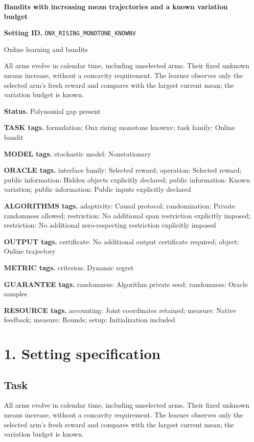 \documentclass[10pt,a4paper]{article}
\begin{document}
\raggedright

{\LARGE\bfseries\sffamily\color{AtlasNavy} Bandits with increasing mean trajectories and a known variation budget\par}\vspace{5pt}
\textbf{Setting ID.} \texttt{ONX\_\allowbreak{}RISING\_\allowbreak{}MONOTONE\_\allowbreak{}KNOWNV}

Online learning and bandits

All arms evolve in calendar time, including unselected arms. Their fixed unknown means increase, without a concavity requirement. The learner observes only the selected arm's fresh reward and compares with the largest current mean; the variation budget is known.

\textbf{Status.} Polynomial gap present

\textbf{TASK tags.} formulation: Onx rising monotone knownv; task family: Online bandit

\textbf{MODEL tags.} stochastic model: Nonstationary

\textbf{ORACLE tags.} interface family: Selected reward; operation: Selected reward; public information: Hidden objects explicitly declared; public information: Known variation; public information: Public inputs explicitly declared

\textbf{ALGORITHMS tags.} adaptivity: Causal protocol; randomization: Private randomness allowed; restriction: No additional span restriction explicitly imposed; restriction: No additional zero-respecting restriction explicitly imposed

\textbf{OUTPUT tags.} certificate: No additional output certificate required; object: Online trajectory

\textbf{METRIC tags.} criterion: Dynamic regret

\textbf{GUARANTEE tags.} randomness: Algorithm private seed; randomness: Oracle samples

\textbf{RESOURCE tags.} accounting: Joint coordinates retained; measure: Native feedback; measure: Rounds; setup: Initialization included

\section{1. Setting specification}
\subsection{Task}
All arms evolve in calendar time, including unselected arms. Their fixed unknown means increase, without a concavity requirement. The learner observes only the selected arm's fresh reward and compares with the largest current mean; the variation budget is known.
\end{document}
